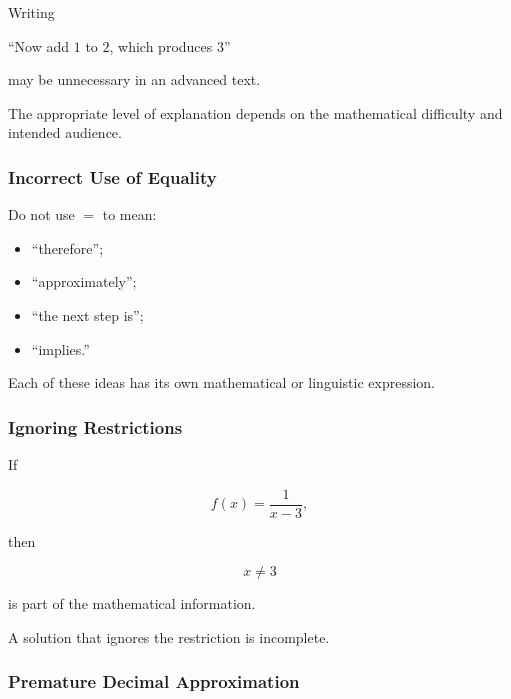 Writing

\begin{center}
``Now add \(1\) to \(2\), which produces \(3\)''
\end{center}

may be unnecessary in an advanced text.

The appropriate level of explanation depends on the mathematical difficulty
and intended audience.

\subsubsection{Incorrect Use of Equality}
\label{subsec:incorrect-equality-writing}

Do not use \(=\) to mean:

\begin{itemize}
    \item ``therefore'';
    \item ``approximately'';
    \item ``the next step is'';
    \item ``implies.''
\end{itemize}

Each of these ideas has its own mathematical or linguistic expression.

\subsubsection{Ignoring Restrictions}
\label{subsec:ignoring-restrictions-writing}

If

\[ f(x)=\frac1{x-3}, \]

then

\[ x\neq3 \]

is part of the mathematical information.

A solution that ignores the restriction is incomplete.

\subsubsection{Premature Decimal Approximation}
\label{subsec:premature-rounding}


